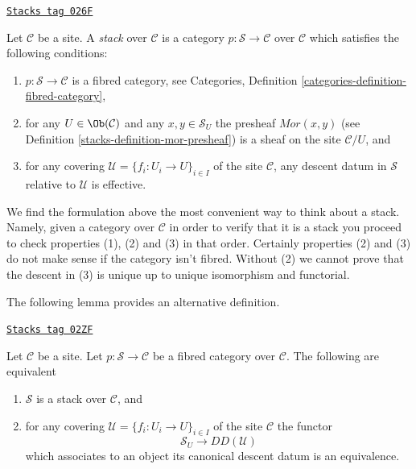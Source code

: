 \begin{definition}[Stack]
\label{stacks-definition-stack}
\href{https://stacks.math.columbia.edu/tag/026F}{\texttt{Stacks tag 026F}}

Let $\mathcal{C}$ be a site. A {\it stack} over $\mathcal{C}$
is a category $p : \mathcal{S} \to \mathcal{C}$ over $\mathcal{C}$ which
satisfies the following conditions:
\begin{enumerate}
\item $p : \mathcal{S} \to \mathcal{C}$ is a fibred category, see
Categories, Definition \ref{categories-definition-fibred-category},
\item for any $U \in \Ob(\mathcal{C})$ and any $x, y \in \mathcal{S}_U$
the presheaf $\mathit{Mor}(x, y)$ (see
Definition \ref{stacks-definition-mor-presheaf}) is a sheaf on
the site $\mathcal{C}/U$, and
\item for any covering $\mathcal{U} = \{f_i : U_i \to U\}_{i \in I}$
of the site $\mathcal{C}$, any descent datum in $\mathcal{S}$
relative to $\mathcal{U}$ is effective.
\end{enumerate}
\end{definition}

We find the formulation above the most convenient way to think about
a stack. Namely, given a category over $\mathcal{C}$ in order to verify
that it is a stack you proceed to check properties (1), (2) and
(3) in that order. Certainly properties (2) and (3) do not make sense
if the category isn't fibred. Without (2) we cannot prove that the
descent in (3) is unique up to unique isomorphism and functorial.

\medskip\noindent
The following lemma provides an alternative definition.

\begin{lemma}
\label{stacks-lemma-stack-equivalences}
\href{https://stacks.math.columbia.edu/tag/02ZF}{\texttt{Stacks tag 02ZF}}

Let $\mathcal{C}$ be a site.
Let $p : \mathcal{S} \to \mathcal{C}$ be a fibred category
over $\mathcal{C}$. The following are equivalent
\begin{enumerate}
\item $\mathcal{S}$ is a stack over $\mathcal{C}$, and
\item for any covering $\mathcal{U} = \{f_i : U_i \to U\}_{i \in I}$
of the site $\mathcal{C}$ the functor
$$
\mathcal{S}_U \longrightarrow DD(\mathcal{U})
$$
which associates to an
object its canonical descent datum is an equivalence.
\end{enumerate}
\end{lemma}

